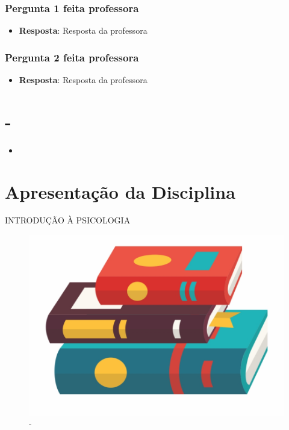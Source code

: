 \documentclass[
]{book}
\providecommand{\tightlist}{%
  \setlength{\itemsep}{0pt}\setlength{\parskip}{0pt}}
\begin{document}
\hypertarget{pergunta-1-feita-professora}{%
\subsection{Pergunta 1 feita professora}\label{pergunta-1-feita-professora}}

\begin{itemize}
\tightlist
\item
  \textbf{Resposta}: Resposta da professora
\end{itemize}

\hypertarget{pergunta-2-feita-professora}{%
\subsection{Pergunta 2 feita professora}\label{pergunta-2-feita-professora}}

\begin{itemize}
\tightlist
\item
  \textbf{Resposta}: Resposta da professora
\end{itemize}

\hypertarget{section}{%
\chapter{-}\label{section}}

\begin{itemize}
\tightlist
\item
\end{itemize}

\hypertarget{apresentauxe7uxe3o-da-disciplina-1}{%
\chapter{Apresentação da Disciplina}\label{apresentauxe7uxe3o-da-disciplina-1}}

INTRODUÇÃO À PSICOLOGIA

\begin{figure}

{\centering \includegraphics[width=0.5\linewidth]{figuras/LIVRO-GENERICO} 

}

\caption{-}\label{fig:unnamed-chunk-14}
\end{figure}
\end{document}
